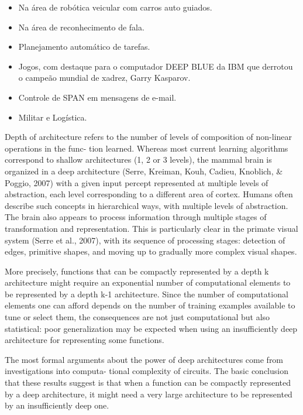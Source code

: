 \documentclass[cic,tc]{iiufrgs}
\begin{document}
\begin{itemize}
\itemsep1pt\parskip0pt
\item
  Na área de robótica veicular com carros auto guiados.
\item
  Na área de reconhecimento de fala.
\item
  Planejamento automático de tarefas.
\item
  Jogos, com destaque para o computador DEEP BLUE da IBM que derrotou o
  campeão mundial de xadrez, Garry Kasparov.
\item
  Controle de SPAN em mensagens de e-mail.
\item
  Militar e Logística.
\end{itemize}


Depth of architecture refers to the number of levels of composition of
non-linear operations in the func- tion learned. Whereas most current learning
algorithms correspond to shallow architectures (1, 2 or 3 levels), the mammal
brain is organized in a deep architecture (Serre, Kreiman, Kouh, Cadieu,
Knoblich, \& Poggio, 2007) with a given input percept represented at multiple
levels of abstraction, each level corresponding to a different area of cortex.
Humans often describe such concepts in hierarchical ways, with multiple levels
of abstraction. The brain also appears to process information through multiple
stages of transformation and representation. This is particularly clear in the
primate visual system (Serre et al., 2007), with its sequence of processing
stages: detection of edges, primitive shapes, and moving up to gradually more
complex visual shapes.\cite{bengio2009learning}

More precisely, functions that can be compactly represented by a depth k
architecture might require an exponential number of computational elements to
be represented by a depth k-1 architecture. Since the number of
computational elements one can afford depends on the number of training
examples available to tune or select them, the consequences are not just
computational but also statistical: poor generalization may be expected when
using an insufficiently deep architecture for representing some
functions.\cite{bengio2009learning}

The most formal arguments about the power of deep architectures come from
investigations into computa- tional complexity of circuits. The basic
conclusion that these results suggest is that when a function can be
compactly represented by a deep architecture, it might need a very large
architecture to be represented by an insufficiently deep
one.\cite{bengio2009learning}
\end{document}
